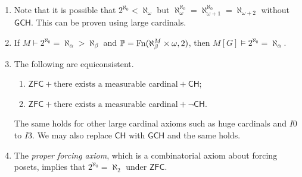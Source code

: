 \begin{remark}
    \begin{enumerate}
        \item Note that it is possible that \( 2^{\aleph_0} < \aleph_\omega \) but \( \aleph_\omega^{\aleph_0} = \aleph_{\omega + 1}^{\aleph_0} = \aleph_{\omega + 2} \) without \( \mathsf{GCH} \).
        This can be proven using large cardinals.
        \item If \( M \vdash 2^{\aleph_0} = \aleph_\alpha > \aleph_\beta \) and \( \mathbb P = \operatorname{Fn}(\aleph_\beta^M \times \omega, 2) \), then \( M[G] \vDash 2^{\aleph_0} = \aleph_\alpha \).
        \item The following are equiconsistent.
        \begin{enumerate}
            \item \( \mathsf{ZFC} + \text{there exists a measurable cardinal} + \mathsf{CH} \);
            \item \( \mathsf{ZFC} + \text{there exists a measurable cardinal} + \neg\mathsf{CH} \).
        \end{enumerate}
        The same holds for other large cardinal axioms such as huge cardinals and \( I0 \) to \( I3 \).
        We may also replace \( \mathsf{CH} \) with \( \mathsf{GCH} \) and the same holds.
        \item The \emph{proper forcing axiom}, which is a combinatorial axiom about forcing posets, implies that \( 2^{\aleph_0} = \aleph_2 \) under \( \mathsf{ZFC} \).
    \end{enumerate}
\end{remark}

